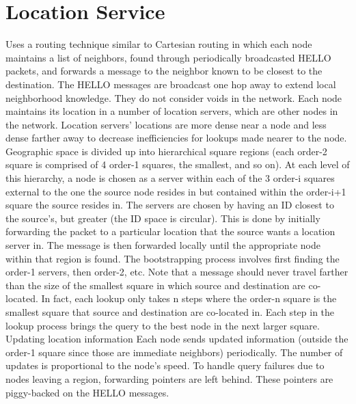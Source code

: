 \documentclass[conference]{IEEEtran}
\begin{document}
\section{Location Service}
\cite{Li:2000:SLS:345910.345931}Uses a routing technique similar to Cartesian routing in which each node maintains a list of neighbors, found through periodically broadcasted HELLO packets, and forwards a message to the neighbor known to be closest to the destination.
The HELLO messages are broadcast one hop away to extend local neighborhood knowledge.
They do not consider voids in the network.
Each node maintains its location in a number of location servers, which are other nodes in the network.
Location servers' locations are more dense near a node and less dense farther away to decrease inefficiencies for lookups made nearer to the node.
Geographic space is divided up into hierarchical square regions (each order-2 square is comprised of 4 order-1 squares, the smallest, and so on).
At each level of this hierarchy, a node is chosen as a server within each of the 3 order-i squares external to the one the source node resides in but contained within the order-i+1 square the source resides in. 
The servers are chosen by having an ID closest to the source's, but greater (the ID space is circular).
This is done by initially forwarding the packet to a particular location that the source wants a location server in.
The message is then forwarded locally until the appropriate node within that region is found.
The bootstrapping process involves first finding the order-1 servers, then order-2, etc.
Note that a message should never travel farther than the size of the smallest square in which source and destination are co-located.
In fact, each lookup only takes n steps where the order-n square is the smallest square that source and destination are co-located in.   
Each step in the lookup process brings the query to the best node in the next larger square.          
Updating location information        
Each node sends updated information (outside the order-1 square since those are immediate neighbors) periodically.
The number of updates is proportional to the node's speed.
To handle query failures due to nodes leaving a region, forwarding pointers are left behind.
These pointers are piggy-backed on the HELLO messages.
\end{document}
